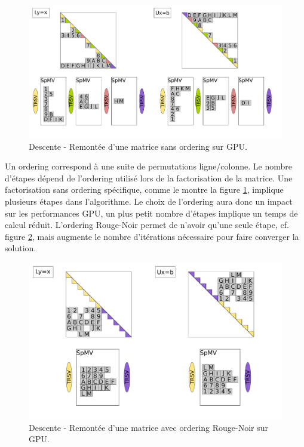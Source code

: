 \documentclass[a4paper,11pt]{report}
\begin{document}
 \begin{figure}[h!]\begin{center}
     \includegraphics[width=\textwidth]{images_total/LU.pdf}
     \caption{Descente - Remontée d'une matrice sans ordering sur GPU.}
     \label{sans_ordering}
 \end{center}\end{figure}

 Un ordering correspond à une suite de permutations ligne/colonne.
 Le nombre d'étapes dépend de l'ordering utilisé lors de la
 factorisation de la matrice. Une factorisation sans ordering
 spécifique, comme le montre la figure \ref{sans_ordering}, implique
 plusieurs étapes dans l'algorithme. Le choix de l'ordering aura donc un impact
 sur les performances GPU, un plus petit nombre d'étapes implique un
 temps de calcul réduit. L'ordering Rouge-Noir permet de n'avoir qu'une
 seule étape, cf. figure \ref{ordering_rb}, mais augmente le nombre
 d'itérations nécessaire pour faire converger la solution.

 \begin{figure}[h!]\begin{center}
     \includegraphics[width=\textwidth]{images_total/LU_improve.pdf}
     \caption{Descente - Remontée d'une matrice avec ordering Rouge-Noir sur GPU.}
     \label{ordering_rb}
 \end{center}\end{figure}
 
\end{document}
